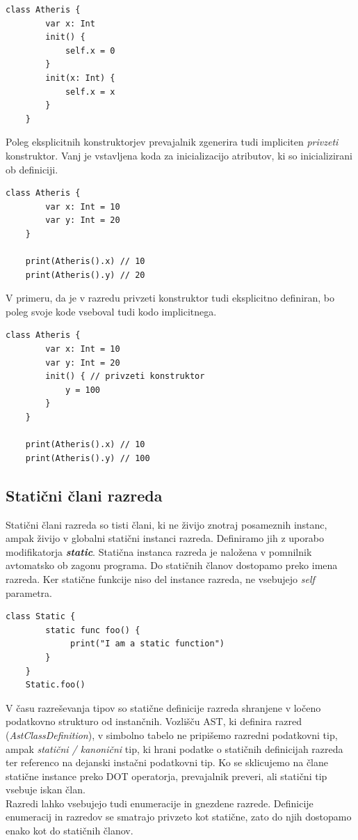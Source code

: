\documentclass[a4paper, 12pt]{book}
\begin{document}
\begin{lstlisting}[caption={Konsturktorji}, captionpos=b]
	class Atheris {
	    var x: Int
	    init() {
	        self.x = 0
	    }
	    init(x: Int) {
	        self.x = x
	    }
	}
\end{lstlisting}

\indent Poleg eksplicitnih konstruktorjev prevajalnik zgenerira tudi impliciten \textit{privzeti} konstruktor. Vanj je vstavljena koda za inicializacijo atributov, ki so inicializirani ob definiciji. 

\begin{lstlisting}[caption={Implicitni privzeti konstruktor}, captionpos=b]
	class Atheris {
	    var x: Int = 10
	    var y: Int = 20
	}
	
	print(Atheris().x) // 10
	print(Atheris().y) // 20
\end{lstlisting}

V primeru, da je v razredu privzeti konstruktor tudi eksplicitno definiran, bo poleg svoje kode vseboval tudi kodo implicitnega.

\begin{lstlisting}[caption={Eksplicitni privzeti konstruktor}, captionpos=b]
	class Atheris {
	    var x: Int = 10
	    var y: Int = 20
	    init() { // privzeti konstruktor
	        y = 100
	    }
	}
	
	print(Atheris().x) // 10
	print(Atheris().y) // 100
\end{lstlisting}

\subsection{Statični člani razreda}

Statični člani razreda so tisti člani, ki ne živijo znotraj posameznih instanc, ampak živijo v globalni statični instanci razreda. Definiramo jih z uporabo modifikatorja \textit{\textbf{static}}. Statična instanca razreda je naložena v pomnilnik avtomatsko ob zagonu programa. Do statičnih članov dostopamo preko imena razreda. Ker statične funkcije niso del instance razreda, ne vsebujejo \textit{self} parametra.

\begin{lstlisting}[caption={Klicanje statične funkcije}, captionpos=b]
	class Static {
   	    static func foo() {
	         print("I am a static function")
	    }
	} 
	Static.foo()
\end{lstlisting}

\indent V času razreševanja tipov so statične definicije razreda shranjene v ločeno podatkovno strukturo od instančnih. Vozlišču AST, ki definira razred (\textit{AstClassDefinition}), v simbolno tabelo ne pripišemo razredni podatkovni tip, ampak \textit{statični / kanonični} tip, ki hrani podatke o statičnih definicijah razreda ter referenco na dejanski instačni podatkovni tip. Ko se sklicujemo na člane statične instance preko DOT operatorja, prevajalnik preveri, ali statični tip vsebuje iskan član.\\
\indent Razredi lahko vsebujejo tudi enumeracije in gnezdene razrede. Definicije enumeracij in razredov se smatrajo privzeto kot statične, zato do njih dostopamo enako kot do statičnih članov. 
\end{document}
